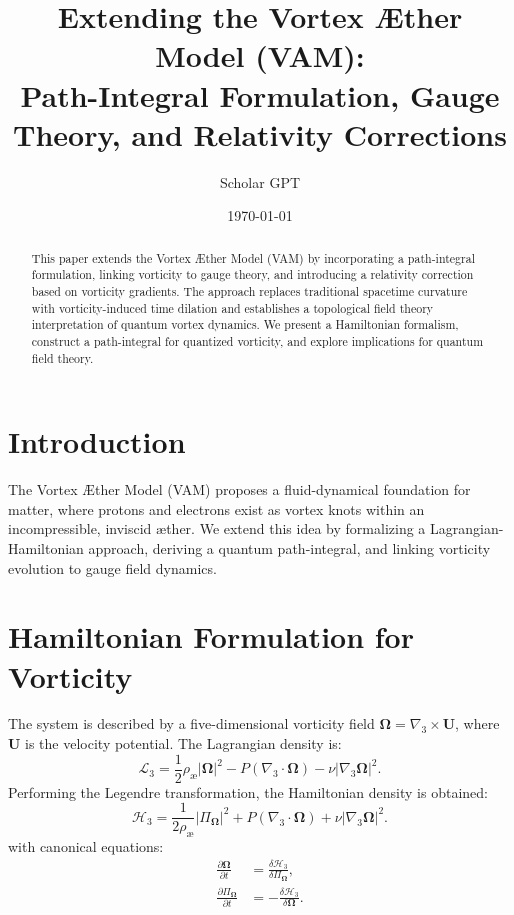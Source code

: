 \documentclass[12pt]{article}
\title{Extending the Vortex Æther Model (VAM): \\ Path-Integral Formulation, Gauge Theory, and Relativity Corrections}
\author{Scholar GPT}
\date{\today}
\begin{document}
\maketitle

    \begin{abstract}
        This paper extends the Vortex Æther Model (VAM) by incorporating a path-integral formulation, linking vorticity to gauge theory, and introducing a relativity correction based on vorticity gradients. The approach replaces traditional spacetime curvature with vorticity-induced time dilation and establishes a topological field theory interpretation of quantum vortex dynamics. We present a Hamiltonian formalism, construct a path-integral for quantized vorticity, and explore implications for quantum field theory.
    \end{abstract}

    \section{Introduction}
    The Vortex Æther Model (VAM) proposes a fluid-dynamical foundation for matter, where protons and electrons exist as vortex knots within an incompressible, inviscid æther. We extend this idea by formalizing a Lagrangian-Hamiltonian approach, deriving a quantum path-integral, and linking vorticity evolution to gauge field dynamics.

    \section{Hamiltonian Formulation for Vorticity}
    The system is described by a five-dimensional vorticity field $\boldsymbol{\Omega} = \nabla_3 \times \mathbf{U}$, where $\mathbf{U}$ is the velocity potential. The Lagrangian density is:
        \begin{equation}
            \mathcal{L}_3 = \frac{1}{2} \rho_{\text{\ae}} |\boldsymbol{\Omega}|^2 - P (\nabla_3 \cdot \boldsymbol{\Omega}) - \nu |\nabla_3 \boldsymbol{\Omega}|^2.
        \end{equation}
    Performing the Legendre transformation, the Hamiltonian density is obtained:
        \begin{equation}
            \mathcal{H}_3 = \frac{1}{2 \rho_{\text{\ae}}} |\Pi_{\boldsymbol{\Omega}}|^2 + P (\nabla_3 \cdot \boldsymbol{\Omega}) + \nu |\nabla_3 \boldsymbol{\Omega}|^2.
        \end{equation}
    with canonical equations:
        \begin{align}
            \frac{\partial \boldsymbol{\Omega}}{\partial t} &= \frac{\delta \mathcal{H}_3}{\delta \Pi_{\boldsymbol{\Omega}}}, \\
            \frac{\partial \Pi_{\boldsymbol{\Omega}}}{\partial t} &= -\frac{\delta \mathcal{H}_3}{\delta \boldsymbol{\Omega}}.
        \end{align}
\end{document}
